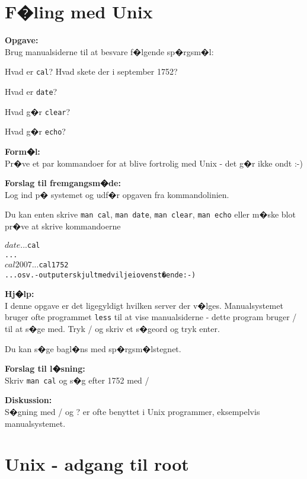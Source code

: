 \documentclass[a4paper,11pt,notitlepage]{oevelser}
\begin{document}
\chapter{F�ling med Unix}
\label{ex:unix-cal}

{\bfseries Opgave:}\\
Brug manualsiderne til at besvare f�lgende sp�rgsm�l:

\begin{list2}
\item Hvad er \verb+cal+? Hvad skete der i september 1752?
\item Hvad er \verb+date+?
\item Hvad g�r \verb+clear+?
\item Hvad g�r \verb+echo+?
\end{list2}


{\bfseries Form�l:}\\
Pr�ve et par kommandoer for at blive fortrolig med Unix - det g�r ikke ondt :-)

{\bfseries Forslag til fremgangsm�de:}\\
Log ind p� systemet og udf�r opgaven fra kommandolinien.

Du kan enten skrive \verb+man cal+, \verb+man date+, \verb+man clear+,
\verb+man echo+ eller m�ske blot pr�ve at skrive kommandoerne

\begin{alltt}
$ date
...
$ cal
...
$ cal 2007
...
$ cal 1752
... osv. - output er skjult med vilje i ovenst�ende :-)
\end{alltt}

{\bfseries Hj�lp:}\\
I denne opgave er det ligegyldigt hvilken server der v�lges.
Manualsystemet bruger ofte programmet \verb+less+ til at vise manualsiderne
- dette program bruger / til at s�ge med. Tryk / og skriv et s�geord
og tryk enter.

Du kan s�ge bagl�ns med sp�rgsm�lstegnet.

{\bfseries Forslag til l�sning:}\\
Skriv \verb+man cal+ og s�g efter 1752 med /

{\bfseries Diskussion:}\\
S�gning med / og ? er ofte benyttet i Unix programmer, eksempelvis
manualsystemet.

\chapter{Unix - adgang til root}
\label{ex:sudo}
\end{document}

